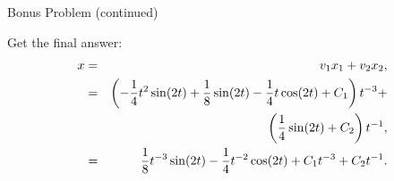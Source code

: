 \begin{frame}{Bonus Problem (continued)}

  Get the final answer:
  \begin{eqnarray*}
    x & = & v_1 x_1 + v_2 x_2 , \\
    & = & \left( -\frac{1}{4} t^2 \sin(2t) + \frac{1}{8} \sin(2t) - \frac{1}{4} t \cos(2t) + C_1 \right) t^{-3} + \\
    & & \left( \frac{1}{4} \sin(2t) + C_2 \right) t^{-1}, \\
    & = &   \frac{1}{8} t^{-3} \sin(2t) - \frac{1}{4} t^{-2} \cos(2t) + C_1 t^{-3} + C_2 t^{-1}. \\
  \end{eqnarray*}


\end{frame}



